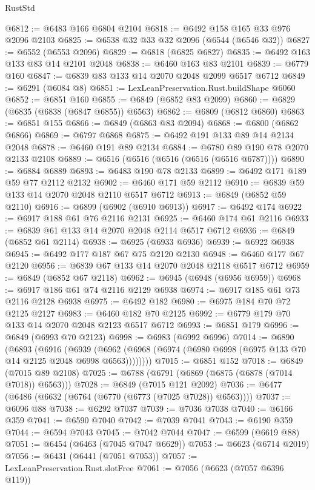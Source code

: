 \begin{lexlean}{RustStd}
\begin{coremodule}
@6812 := @6483 @166 @6804 @2104
@6818 := @6492 @158 @165 @33 @976 @2096 @2103
@6825 := @6538 @32 @33 @32 @2096 (@6544 (@6546 @32))
@6827 := @6552 (@6553 @2096)
@6829 := @6818 (@6825 @6827)
@6835 := @6492 @163 @133 @83 @14 @2101 @2048
@6838 := @6460 @163 @83 @2101
@6839 := @6779 @160
@6847 := @6839 @83 @133 @14 @2070 @2048 @2099 @6517 @6712
@6849 := @6291 (@6084 @8)
@6851 := LexLeanPreservation.Rust.buildShape @6060
@6852 := @6851 @160
@6855 := @6849 (@6852 @83 @2099)
@6860 := @6829 (@6835 (@6838 (@6847 @6855)) @6563)
@6862 := @6809 (@6812 @6860)
@6863 := @6851 @155
@6866 := @6849 (@6863 @83 @2094)
@6868 := @6800 (@6862 @6866)
@6869 := @6797 @6868
@6875 := @6492 @191 @133 @89 @14 @2134 @2048
@6878 := @6460 @191 @89 @2134
@6884 := @6780 @89 @190 @78 @2070 @2133 @2108
@6889 := @6516 (@6516 (@6516 (@6516 (@6516 @6787))))
@6890 := @6884 @6889
@6893 := @6483 @190 @78 @2133
@6899 := @6492 @171 @189 @59 @77 @2112 @2132
@6902 := @6460 @171 @59 @2112
@6910 := @6839 @59 @133 @14 @2070 @2048 @2110 @6517 @6712
@6913 := @6849 (@6852 @59 @2110)
@6916 := @6899 (@6902 (@6910 @6913))
@6917 := @6492 @174
@6922 := @6917 @188 @61 @76 @2116 @2131
@6925 := @6460 @174 @61 @2116
@6933 := @6839 @61 @133 @14 @2070 @2048 @2114 @6517 @6712
@6936 := @6849 (@6852 @61 @2114)
@6938 := @6925 (@6933 @6936)
@6939 := @6922 @6938
@6945 := @6492 @177 @187 @67 @75 @2120 @2130
@6948 := @6460 @177 @67 @2120
@6956 := @6839 @67 @133 @14 @2070 @2048 @2118 @6517 @6712
@6959 := @6849 (@6852 @67 @2118)
@6962 := @6945 (@6948 (@6956 @6959))
@6968 := @6917 @186 @61 @74 @2116 @2129 @6938
@6974 := @6917 @185 @61 @73 @2116 @2128 @6938
@6975 := @6492 @182
@6980 := @6975 @184 @70 @72 @2125 @2127
@6983 := @6460 @182 @70 @2125
@6992 := @6779 @179 @70 @133 @14 @2070 @2048 @2123 @6517 @6712
@6993 := @6851 @179
@6996 := @6849 (@6993 @70 @2123)
@6998 := @6983 (@6992 @6996)
@7014 := @6890
    (@6893
      (@6916
        (@6939 (@6962 (@6968 (@6974 (@6980 @6998 (@6975 @133 @70 @14 @2125 @2048 @6998 @6563))))))))
@7015 := @6851 @152
@7018 := @6849 (@7015 @89 @2108)
@7025 := @6788 (@6791 (@6869 (@6875 (@6878 (@7014 @7018)) @6563)))
@7028 := @6849 (@7015 @121 @2092)
@7036 := @6477 (@6486 (@6632 (@6764 (@6770 (@6773 (@7025 @7028)) @6563))))
@7037 := @6096 @88
@7038 := @6292 @7037
@7039 := @7036 @7038
@7040 := @6166 @359
@7041 := @6590 @7040
@7042 := @7039 @7041
@7043 := @6190 @359
@7044 := @6594 @7043
@7045 := @7042 @7044
@7047 := @6599 (@6619 @88)
@7051 := @6454 (@6463 (@7045 @7047 @6629))
@7053 := @6623 (@6714 @2019)
@7056 := @6431 (@6441 (@7051 @7053))
@7057 := LexLeanPreservation.Rust.slotFree
@7061 := @7056 (@6623 (@7057 @6396 @119))

\end{coremodule}
\end{lexlean}
